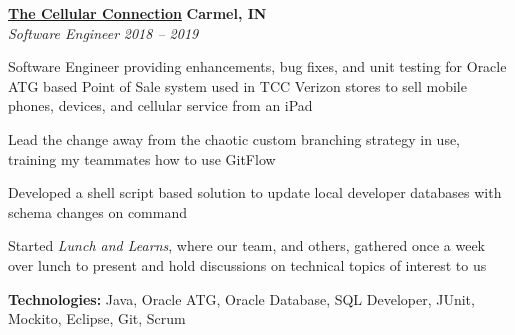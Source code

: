 %
    \headerrow
        {\textbf{\href{https://www.tccrocks.com/}{The Cellular Connection}}}
        {\textbf{Carmel, IN}}
    \\
    \headerrow
        {\emph{Software Engineer}}
        {\emph{2018 -- 2019}}
    \begin{itemize*}
        \item Software Engineer providing enhancements, bug fixes, and unit testing for Oracle ATG
            based Point of Sale system used in TCC Verizon stores to sell mobile phones, devices, and cellular service from an iPad
        \item Lead the change away from the chaotic custom branching strategy in use, training my teammates how to use GitFlow
        \item Developed a shell script based solution to update local developer databases with schema changes on command
        \item Started \emph{Lunch and Learns}, where our team, and others, gathered once a week over lunch to present and hold
            discussions on technical topics of interest to us
    \end{itemize*}

    \hspace{1.0em}
        {\textbf{Technologies:} Java, Oracle ATG, Oracle Database, SQL Developer, JUnit, Mockito, Eclipse, Git, Scrum}
